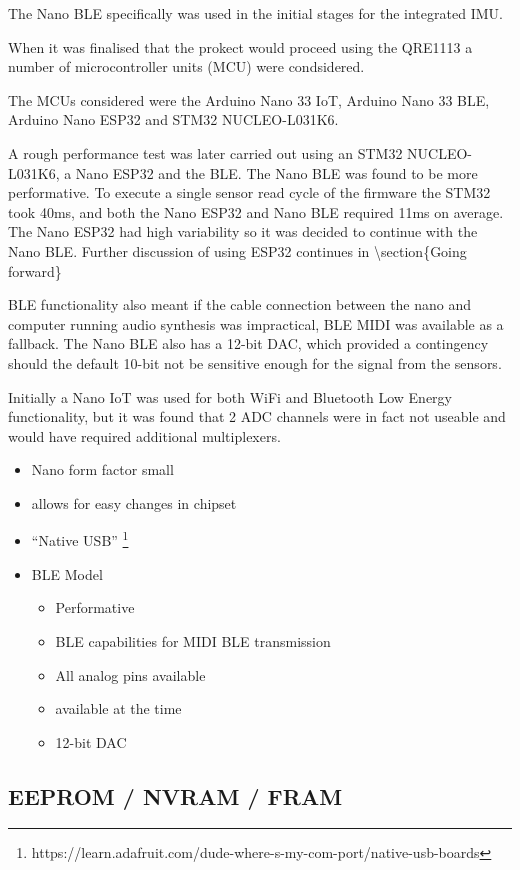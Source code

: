 The Nano BLE specifically was used in the initial stages for the
integrated IMU.

When it was finalised that the prokect would proceed using the QRE1113 a
number of microcontroller units (MCU) were condsidered.

The MCUs considered were the Arduino Nano 33 IoT, Arduino Nano 33 BLE,
Arduino Nano ESP32 and STM32 NUCLEO-L031K6.

A rough performance test was later carried out using an STM32
NUCLEO-L031K6, a Nano ESP32 and the BLE. The Nano BLE was found to be
more performative. To execute a single sensor read cycle of the firmware
the STM32 took 40ms, and both the Nano ESP32 and Nano BLE required 11ms
on average. The Nano ESP32 had high variability so it was decided to
continue with the Nano BLE. Further discussion of using ESP32 continues
in \textbackslash section\{Going forward\}

BLE functionality also meant if the cable connection between the nano
and computer running audio synthesis was impractical, BLE MIDI was
available as a fallback. The Nano BLE also has a 12-bit DAC, which
provided a contingency should the default 10-bit not be sensitive enough
for the signal from the sensors.

Initially a Nano IoT was used for both WiFi and Bluetooth Low Energy
functionality, but it was found that 2 ADC channels were in fact not
useable and would have required additional multiplexers.

\begin{itemize}
\item
  Nano form factor small
\item
  allows for easy changes in chipset
\item
  ``Native USB''
  \footnote{https://learn.adafruit.com/dude-where-s-my-com-port/native-usb-boards}
\item
  BLE Model

  \begin{itemize}
  \item
    Performative
  \item
    BLE capabilities for MIDI BLE transmission
  \item
    All analog pins available
  \item
    available at the time
  \item
    12-bit DAC
  \end{itemize}
\end{itemize}

\subsection{EEPROM / NVRAM / FRAM}\label{eeprom-nvram-fram}

